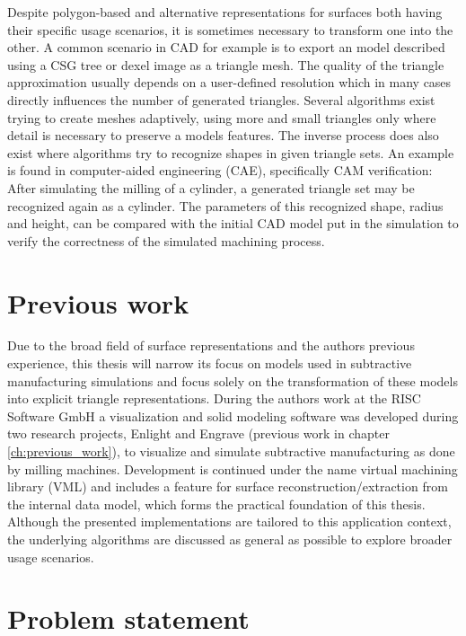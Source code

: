 Despite polygon-based and alternative representations for surfaces both having their specific usage scenarios, it is sometimes necessary to transform one into the other.
A common scenario in CAD for example is to export an model described using a CSG tree or dexel image as a triangle mesh.
The quality of the triangle approximation usually depends on a user-defined resolution which in many cases directly influences the number of generated triangles.
Several algorithms exist trying to create meshes adaptively, using more and small triangles only where detail is necessary to preserve a models features.
%
The inverse process does also exist where algorithms try to recognize shapes in given triangle sets.
An example is found in computer-aided engineering (CAE), specifically CAM verification: After simulating the milling of a cylinder, a generated triangle set may be recognized again as a cylinder. The parameters of this recognized shape, \eg radius and height, can be compared with the initial CAD model put in the simulation to verify the correctness of the simulated machining process.


\section{Previous work}

Due to the broad field of surface representations and the authors previous experience, this thesis will narrow its focus on models used in subtractive manufacturing simulations and focus solely on the transformation of these models into explicit triangle representations.
During the authors work at the RISC Software GmbH a visualization and solid modeling software was developed during two research projects, Enlight and Engrave (\cf previous work in chapter \ref{ch:previous_work}), to visualize and simulate subtractive manufacturing as done by milling machines.
Development is continued under the name virtual machining library (VML) and includes a feature for surface reconstruction/extraction from the internal data model, which forms the practical foundation of this thesis.
Although the presented implementations are tailored to this application context, the underlying algorithms are discussed as general as possible to explore broader usage scenarios.


\section{Problem statement}
\label{sec:problem}


